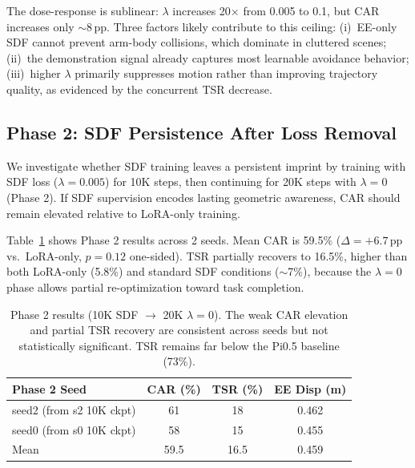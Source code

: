 \documentclass[letterpaper]{article}
\begin{document}
The dose-response is sublinear: $\lambda$ increases 20$\times$ from 0.005 to 0.1, but CAR increases only ${\sim}$8\,pp. Three factors likely contribute to this ceiling: (i)~EE-only SDF cannot prevent arm-body collisions, which dominate in cluttered scenes; (ii)~the demonstration signal already captures most learnable avoidance behavior; (iii)~higher $\lambda$ primarily suppresses motion rather than improving trajectory quality, as evidenced by the concurrent TSR decrease.


\subsection{Phase 2: SDF Persistence After Loss Removal}
\label{sec:phase2}

We investigate whether SDF training leaves a persistent imprint by training with SDF loss ($\lambda = 0.005$) for 10K steps, then continuing for 20K steps with $\lambda = 0$ (Phase 2). If SDF supervision encodes lasting geometric awareness, CAR should remain elevated relative to LoRA-only training.

Table~\ref{tab:phase2} shows Phase 2 results across 2 seeds. Mean CAR is 59.5\% ($\Delta = +6.7$\,pp vs.\ LoRA-only, $p = 0.12$ one-sided). TSR partially recovers to 16.5\%, higher than both LoRA-only (5.8\%) and standard SDF conditions (${\sim}$7\%), because the $\lambda = 0$ phase allows partial re-optimization toward task completion.

\begin{table}[t]
\centering
\caption{Phase 2 results (10K SDF $\to$ 20K $\lambda{=}0$). The weak CAR elevation and partial TSR recovery are consistent across seeds but not statistically significant. TSR remains far below the Pi0.5 baseline (73\%).}
\label{tab:phase2}
\begin{tabular}{lccc}
\toprule
Phase 2 Seed & CAR (\%) & TSR (\%) & EE Disp (m) \\
\midrule
seed2 (from s2 10K ckpt) & 61 & 18 & 0.462 \\
seed0 (from s0 10K ckpt) & 58 & 15 & 0.455 \\
\midrule
Mean & 59.5 & 16.5 & 0.459 \\
\bottomrule
\end{tabular}
\end{table}
\end{document}
